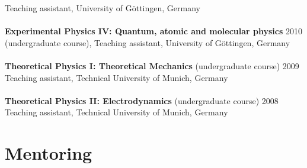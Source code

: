 \documentclass[margin,line]{res}
\begin{document}
\begin{resume}
Teaching assistant, University of Göttingen, Germany \\
\vspace*{-3mm}\\
{\bf Experimental Physics IV: Quantum, atomic and molecular physics}  \hfill {2010}\\
(undergraduate course), Teaching assistant, University of Göttingen, Germany\\
\vspace*{-3mm}\\
{\bf Theoretical Physics I: Theoretical Mechanics} (undergraduate course) \hfill {2009}\\
Teaching assistant, Technical University of Munich, Germany\\
\vspace*{-3mm}\\
{\bf Theoretical Physics II: Electrodynamics} (undergraduate course) \hfill {2008}\\
Teaching assistant, Technical University of Munich, Germany


\section{\sc Mentoring}


\end{resume}
\end{document}
